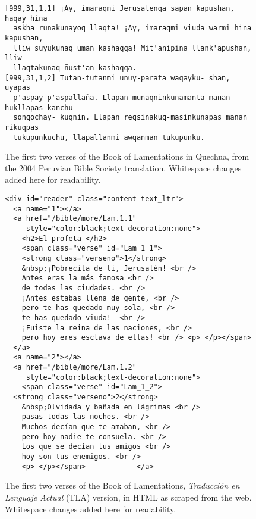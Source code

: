 \begin{figure*}
\raggedright \begin{verbatim}
[999,31,1,1] ¡Ay, imaraqmi Jerusalenqa sapan kapushan, haqay hina
  askha runakunayoq llaqta! ¡Ay, imaraqmi viuda warmi hina kapushan,
  lliw suyukunaq uman kashaqqa! Mit'anipina llank'apushan, lliw
  llaqtakunaq ñust'an kashaqqa.
[999,31,1,2] Tutan-tutanmi unuy-parata waqayku- shan, uyapas
  p'aspay-p'aspallaña. Llapan munaqninkunamanta manan hukllapas kanchu
  sonqochay- kuqnin. Llapan reqsinakuq-masinkunapas manan rikuqpas
  tukupunkuchu, llapallanmi awqanman tukupunku.
\end{verbatim}
  \caption{The first two verses of the Book of Lamentations in Quechua, from
  the 2004 Peruvian Bible Society translation. Whitespace changes added here
  for readability.}
  \label{fig:loza}
\end{figure*}

\begin{figure*}
\raggedright \begin{verbatim}
<div id="reader" class="content text_ltr">
  <a name="1"></a>
  <a href="/bible/more/Lam.1.1"
     style="color:black;text-decoration:none">
    <h2>El profeta </h2>
    <span class="verse" id="Lam_1_1">
    <strong class="verseno">1</strong>
    &nbsp;¡Pobrecita de ti, Jerusalén! <br />
    Antes eras la más famosa <br />
    de todas las ciudades. <br />
    ¡Antes estabas llena de gente, <br />
    pero te has quedado muy sola, <br />
    te has quedado viuda!  <br />
    ¡Fuiste la reina de las naciones, <br />
    pero hoy eres esclava de ellas! <br /> <p> </p></span>
  </a>
  <a name="2"></a>
  <a href="/bible/more/Lam.1.2"
     style="color:black;text-decoration:none">
    <span class="verse" id="Lam_1_2">
  <strong class="verseno">2</strong>
    &nbsp;Olvidada y bañada en lágrimas <br />
    pasas todas las noches. <br />
    Muchos decían que te amaban, <br />
    pero hoy nadie te consuela. <br />
    Los que se decían tus amigos <br />
    hoy son tus enemigos. <br />
    <p> </p></span>            </a>
\end{verbatim}
  \caption{The first two verses of the Book of Lamentations, \emph{Traducción en
  Lenguaje Actual} (TLA) version, in HTML as scraped from the web. Whitespace
  changes added here for readability.}
  \label{fig:es-html-sample}
\end{figure*}


